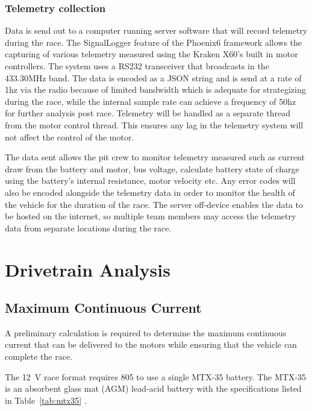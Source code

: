 \documentclass[12pt]{article}
\begin{document}
\subsubsection{Telemetry collection}
Data is send out to a computer running server software that will record telemetry during the race. The SignalLogger feature of the Phoenix6 framework allows the capturing of various telemetry measured using the Kraken X60's built in motor controllers. The system uses a RS232 transceiver that broadcasts in the 433.30MHz band. The data is encoded as a JSON string and is send at a rate of 1hz via the radio because of limited bandwidth which is adequate for strategizing during the race, while the internal sample rate can achieve a frequency of 50hz for further analysis post race. Telemetry will be handled as a separate thread from the motor control thread. This ensures any lag in the telemetry system will not affect the control of the motor.

The data sent allows the pit crew to monitor telemetry measured such as current draw from the battery and motor, bus voltage, calculate battery state of charge using the battery's internal resistance, motor velocity etc. Any error codes will also be encoded alongside the telemetry data in order to monitor the health of the vehicle for the duration of the race. The server off-device enables the data to be hosted on the internet, so multiple team members may access the telemetry data from separate locations during the race. 





\section{Drivetrain Analysis}

\subsection{Maximum Continuous Current}

A preliminary calculation is required to determine the maximum continuous
current that can be delivered to the motors while ensuring that the vehicle
can complete the race.

The 12~V race format requires 805 to use a single MTX-35 battery. The
MTX-35 is an absorbent glass mat (AGM) lead-acid battery with the
specifications listed in Table~\ref{tab:mtx35} \cite{mtx35}.
\end{document}
